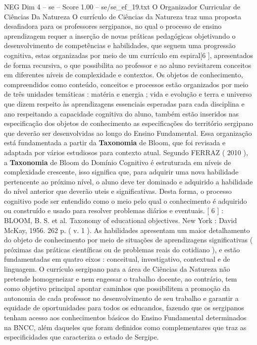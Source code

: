 \begin{textsample}{NEG Dim 4 – se – Score 1.00 – se/se\_ef\_19.txt}  \label{ex:f4_neg_146}
O Organizador Curricular de Ciências Da Natureza O currículo de Ciências da Natureza traz uma proposta desafiadora para os professores sergipanos, no qual o processo de ensino aprendizagem requer a inserção de novas práticas pedagógicas objetivando o desenvolvimento de competências e habilidades, que seguem uma progressão cognitiva, estas organizadas por meio de um currículo em espiral[6 ], apresentados de forma recursiva, o que possibilita ao professor e ao aluno revisitarem conceitos em diferentes níveis de complexidade e contextos.
Os objetos de conhecimento, compreendidos como conteúdo, conceitos e processos estão organizados por meio de três unidades temáticas : matéria e energia ; vida e evolução e terra e universo que dizem respeito às aprendizagens essenciais esperadas para cada disciplina e ano respeitando a capacidade cognitiva do aluno, também estão inseridos nas especificação dos objetos de conhecimento as especificações do território sergipano que deverão ser desenvolvidas ao longo do Ensino Fundamental.
Essa organização está fundamentada a partir da \textbf{Taxonomia} de Bloom, que foi revisada e adaptada por vários estudiosos para contexto atual.
Segundo FERRAZ ( 2010 ), a \textbf{Taxonomia} de Bloom do Domínio Cognitivo é estruturada em níveis de complexidade crescente, isso significa que, para adquirir uma nova habilidade pertencente ao próximo nível, o aluno deve ter dominado e adquirido a habilidade do nível anterior que deverão uteis e significativas.
Desta forma, o processo cognitivo pode ser entendido como o meio pelo qual o conhecimento é adquirido ou construído e usado para resolver problemas diários e eventuais. [ 6 ] : BLOOM, B.
S. et al.
Taxonomy of educational objectives.
New York : David McKay, 1956. 262 p. ( v. 1 ).
As habilidades apresentam um maior detalhamento do objeto de conhecimento por meio de situações de aprendizagens significativas ( próximas das práticas científicas ou de problemas reais do cotidiano ), e estão fundamentadas em quatro eixos : conceitual, investigativo, contextual e de linguagem.
O currículo sergipano para a área de Ciências da Natureza não pretende homogeneizar e nem engessar o trabalho docente, ao contrário, tem como objetivo principal apontar caminhos que possibilitem a promoção da autonomia de cada professor no desenvolvimento de seu trabalho e garantir a equidade de oportunidades para todos os educandos, fazendo que os sergipanos tenham acesso aos conhecimentos básicos do Ensino Fundamental determinados na BNCC, além daqueles que foram definidos como complementares que traz as especificidades que caracteriza o estado de Sergipe.

\end{textsample}
